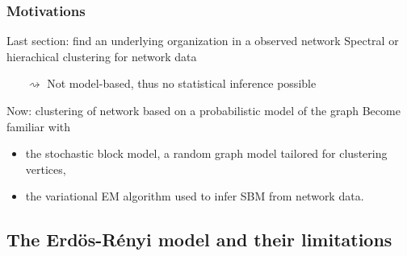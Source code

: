 \documentclass{beamer}\usepackage[]{graphicx}\usepackage[]{color}
\begin{document}
\begin{frame}
  \frametitle{Motivations}

  \begin{block}{Last section: \alert{find an underlying organization in a observed network}}
    Spectral or hierachical clustering for network data \\
    \begin{itemize}
      \item[$\rightsquigarrow$] \alert{Not model-based}, thus no statistical inference possible
    \end{itemize}
  \end{block}

  \begin{block}{Now: \alert{clustering of network based on a probabilistic model of the graph}}
    Become familiar with
    \begin{itemize}
      \item the stochastic block model, a random graph model tailored for clustering vertices,
      \item the variational EM algorithm used to infer SBM from network data.
    \end{itemize}
  \end{block}


\end{frame}

\subsection{The Erdös-Rényi model and their limitations}
\end{document}
